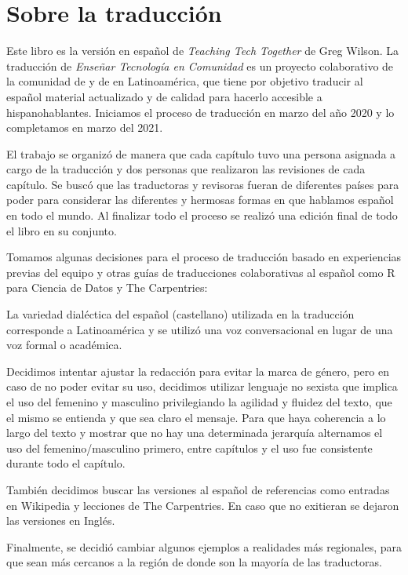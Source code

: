 \chapter*{Sobre la traducción}

Este libro es la versión en español de \emph{Teaching Tech Together} de Greg Wilson.
La traducción de \emph{Enseñar Tecnología en Comunidad} es un proyecto colaborativo
de la comunidad de 
y de  en Latinoamérica,
que tiene por objetivo traducir al español material actualizado y de calidad para hacerlo accesible a hispanohablantes.
Iniciamos el proceso de traducción en marzo del año 2020 y lo completamos en marzo del 2021.

El trabajo se organizó de manera que cada capítulo tuvo una persona asignada a cargo de la traducción 
y dos personas que realizaron las revisiones de cada capítulo.  
Se buscó que las traductoras y revisoras fueran de diferentes países para poder para considerar las 
diferentes y hermosas formas en que hablamos español en todo el mundo.
Al finalizar todo el proceso se realizó una edición final de todo el libro en su conjunto.

Tomamos algunas decisiones para el proceso de traducción basado en experiencias previas
del equipo y otras guías de traducciones colaborativas al español como {R para Ciencia de Datos}{}
y {The Carpentries}{}:

La variedad dialéctica del español (castellano) utilizada en la traducción corresponde 
a Latinoamérica y se utilizó una voz conversacional en lugar de una voz formal o académica.

Decidimos intentar ajustar la redacción para evitar la marca de género, pero
en caso de no poder evitar su uso, decidimos utilizar lenguaje no sexista  
que implica el uso del femenino y masculino privilegiando la agilidad y fluidez del texto, 
que el mismo se entienda y que sea claro el mensaje. Para que haya coherencia 
a lo largo del texto y mostrar que no hay una determinada jerarquía 
alternamos el uso del femenino/masculino primero, entre capítulos 
y el uso fue consistente durante todo el capítulo. 

También decidimos buscar las versiones al español de referencias como 
entradas en Wikipedia y lecciones de The Carpentries.  En caso que no exitieran 
se dejaron las versiones en Inglés.

Finalmente, se decidió cambiar algunos ejemplos a realidades más regionales, 
para que sean más cercanos a la región de donde son la mayoría de las
traductoras.

